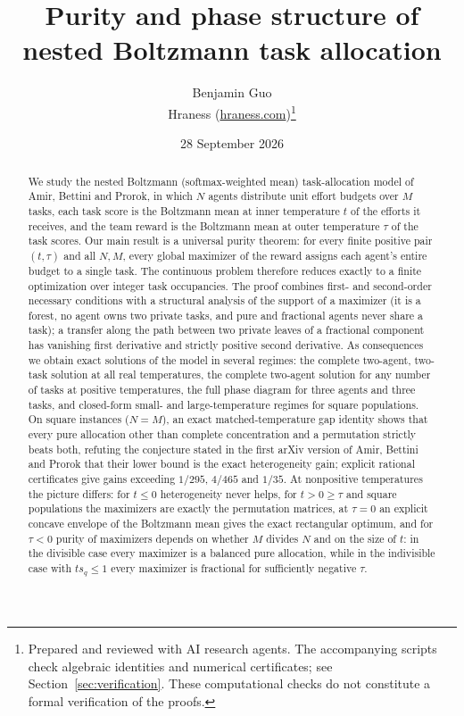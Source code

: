 \documentclass[11pt]{article}
\title{Purity and phase structure of nested Boltzmann task allocation}
\author{Benjamin Guo\\ Hraness (\url{hraness.com})\thanks{Prepared and reviewed with AI research agents. The accompanying scripts check algebraic identities and numerical certificates; see Section~\ref{sec:verification}. These computational checks do not constitute a formal verification of the proofs.}}
\date{28 September 2026}
\theoremstyle{plain}
\theoremstyle{definition}
\theoremstyle{remark}
\begin{document}
\maketitle

\begin{abstract}
We study the nested Boltzmann (softmax-weighted mean) task-allocation model of Amir, Bettini and Prorok, in which $N$ agents distribute unit effort budgets over $M$ tasks, each task score is the Boltzmann mean at inner temperature $t$ of the efforts it receives, and the team reward is the Boltzmann mean at outer temperature $\tau$ of the task scores. Our main result is a universal purity theorem: for every finite positive pair $(t,\tau)$ and all $N,M$, every global maximizer of the reward assigns each agent's entire budget to a single task. The continuous problem therefore reduces exactly to a finite optimization over integer task occupancies. The proof combines first- and second-order necessary conditions with a structural analysis of the support of a maximizer (it is a forest, no agent owns two private tasks, and pure and fractional agents never share a task); a transfer along the path between two private leaves of a fractional component has vanishing first derivative and strictly positive second derivative. As consequences we obtain exact solutions of the model in several regimes: the complete two-agent, two-task solution at all real temperatures, the complete two-agent solution for any number of tasks at positive temperatures, the full phase diagram for three agents and three tasks, and closed-form small- and large-temperature regimes for square populations. On square instances ($N=M$), an exact matched-temperature gap identity shows that every pure allocation other than complete concentration and a permutation strictly beats both, refuting the conjecture stated in the first arXiv version of Amir, Bettini and Prorok that their lower bound is the exact heterogeneity gain; explicit rational certificates give gains exceeding $1/295$, $4/465$ and $1/35$. At nonpositive temperatures the picture differs: for $t\le 0$ heterogeneity never helps, for $t>0\ge\tau$ and square populations the maximizers are exactly the permutation matrices, at $\tau=0$ an explicit concave envelope of the Boltzmann mean gives the exact rectangular optimum, and for $\tau<0$ purity of maximizers depends on whether $M$ divides $N$ and on the size of $t$: in the divisible case every maximizer is a balanced pure allocation, while in the indivisible case with $ts_q\le 1$ every maximizer is fractional for sufficiently negative $\tau$.
\end{abstract}
\end{document}
